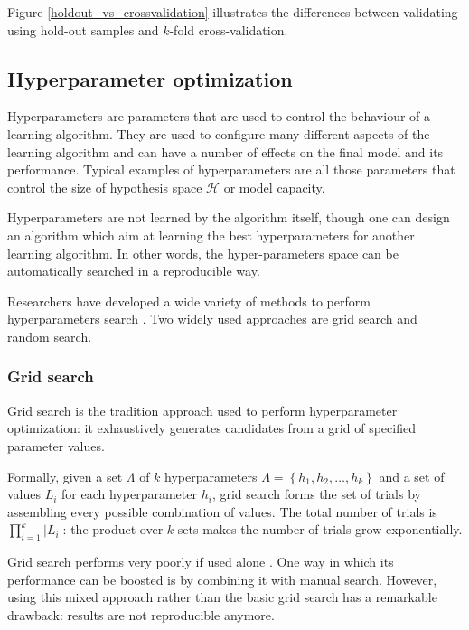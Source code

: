                 
                
                Figure \ref{holdout_vs_crossvalidation} illustrates the differences between validating using hold-out samples and \(k\)-fold cross-validation.
        \subsection{Hyperparameter optimization}\label{ml_hyper_optimization}
            Hyperparameters are parameters that are used to control the behaviour of a learning algorithm. They are used to configure many different aspects of the learning algorithm and can have a number of effects on the final model and its performance. Typical examples of hyperparameters are all those parameters that control the size of hypothesis space \(\mathcal{H}\) or model capacity.
            
            Hyperparameters are not learned by the algorithm itself, though one can design an algorithm which aim at learning the best hyperparameters for another learning algorithm. In other words, the hyper-parameters space can be automatically searched in a reproducible way. 
            
            Researchers have developed a wide variety of methods to perform hyperparameters search \cite{Claesen}. Two widely used approaches are grid search and random search.
            \subsubsection{Grid search}
                Grid search is the tradition approach used to perform hyperparameter optimization: it exhaustively generates candidates from a grid of specified parameter values.
                
                Formally, given a set \(\Lambda\) of \(k\) hyperparameters \(\Lambda = \left\{h_{1},h_{2},\dots,h_{k}\right\}\) and a set of values \(L_{i}\) for each hyperparameter \(h_{i}\), grid search forms the set of trials by assembling every possible combination of values. The total number of trials is \(\prod_{i=1}^{k}\left|L_{i}\right|\): the product over \(k\) sets makes the number of trials grow exponentially.
                
                Grid search performs very poorly if used alone \cite{Bergstra}. One way in which its performance can be boosted is by combining it with manual search. However, using this mixed approach rather than the basic grid search has a remarkable drawback: results are not reproducible anymore.
                
